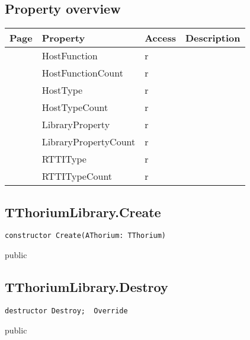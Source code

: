 \subsection{Property overview}
\label{thoriumcore:thorium:tthoriumlibrary:properties}
\begin{tabularx}{\textwidth}{lllX}
Page & Property & Access & Description \\ \hline
\pageref{thoriumcore:thorium:tthoriumlibrary:hostfunction} & HostFunction & r &  \\
\pageref{thoriumcore:thorium:tthoriumlibrary:hostfunctioncount} & HostFunctionCount & r &  \\
\pageref{thoriumcore:thorium:tthoriumlibrary:hosttype} & HostType & r &  \\
\pageref{thoriumcore:thorium:tthoriumlibrary:hosttypecount} & HostTypeCount & r &  \\
\pageref{thoriumcore:thorium:tthoriumlibrary:libraryproperty} & LibraryProperty & r &  \\
\pageref{thoriumcore:thorium:tthoriumlibrary:librarypropertycount} & LibraryPropertyCount & r &  \\
\pageref{thoriumcore:thorium:tthoriumlibrary:rttitype} & RTTIType & r &  \\
\pageref{thoriumcore:thorium:tthoriumlibrary:rttitypecount} & RTTITypeCount & r &  \\
\hline
\end{tabularx}
\subsection{TThoriumLibrary.Create}
\label{thoriumcore:thorium:tthoriumlibrary:create}
\begin{FPCList}
\Synopsis
\Declaration 

\begin{verbatim}
constructor Create(AThorium: TThorium)
\end{verbatim}
\Visibility
public
\Description
\Errors
\end{FPCList}
\subsection{TThoriumLibrary.Destroy}
\label{thoriumcore:thorium:tthoriumlibrary:destroy}
\begin{FPCList}
\Synopsis
\Declaration 

\begin{verbatim}
destructor Destroy;  Override
\end{verbatim}
\Visibility
public
\Description
\Errors
\end{FPCList}
